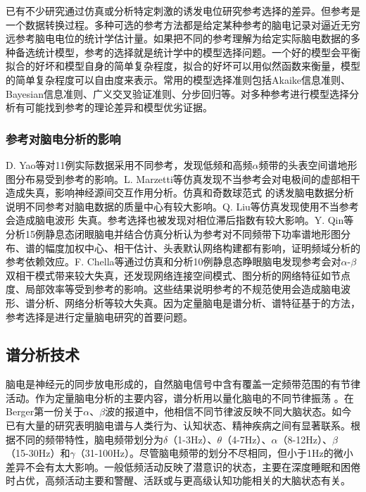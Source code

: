 已有不少研究通过仿真或分析特定刺激的诱发电位研究参考选择的差异。但参考是一个数据转换过程。多种可选的参考方法都是给定某种参考的脑电记录对逼近无穷远参考脑电电位的统计学估计量。如果把不同的参考理解为给定实际脑电数据的多种备选统计模型，参考的选择就是统计学中的模型选择问题。一个好的模型会平衡拟合的好坏和模型自身的简单复杂程度，拟合的好坏可以用似然函数来衡量，模型的简单复杂程度可以自由度来表示。常用的模型选择准则包括Akaike信息准则、Bayesian信息准则、广义交叉验证准则、分步回归等。对多种参考进行模型选择分析有可能找到参考的理论差异和模型优劣证据。

\subsubsection{参考对脑电分析的影响}
D. Yao等对11例实际数据采用不同参考，发现低频和高频$\alpha$频带的头表空间谱地形图分布易受到参考的影响。L. Marzetti等仿真发现不当参考会对电极间的虚部相干造成失真，影响神经源间交互作用分析。仿真和奇数球范式
的诱发脑电数据分析说明不同参考对脑电数据的质量中心有较大影响。Q. Liu等仿真发现使用不当参考会造成脑电波形
失真。参考选择也被发现对相位滞后指数有较大影响。Y. Qin等分析15例静息态闭眼脑电并结合仿真分析认为参考对不同频带下功率谱地形图分布、谱的幅度加权中心、相干估计、头表默认网络构建都有影响，证明频域分析的参考依赖效应。F. Chella等通过仿真和分析10例静息态睁眼脑电发现参考会对$\alpha$-$\beta$双相干模式带来较大失真，还发现网络连接空间模式、图分析的网络特征如节点度、局部效率等受到参考的影响。这些结果说明参考的不规范使用会造成脑电波形、谱分析、网络分析等较大失真。因为定量脑电是谱分析、谱特征基于的方法，参考选择是进行定量脑电研究的首要问题。

\subsection{谱分析技术}
脑电是神经元的同步放电形成的，自然脑电信号中含有覆盖一定频带范围的有节律活动。作为定量脑电分析的主要内容，谱分析用以量化脑电的不同节律振荡
。在Berger第一份关于$\alpha$、$\beta$波的报道中，他相信不同节律波反映不同大脑状态。如今已有大量的研究表明脑电谱与人类行为、认知状态、精神疾病之间有显著联系。根据不同的频带特性，脑电频带划分为$\delta$（1-3Hz）、$\theta$（4-7Hz）、$\alpha$（8-12Hz）、$\beta$（15-30Hz）和$\gamma$（31-100Hz）。尽管脑电频带的划分不尽相同，但小于1Hz的微小差异不会有太大影响。一般低频活动反映了潜意识的状态，主要在深度睡眠和困倦时占优，高频活动主要和警醒、活跃或与更高级认知功能相关的大脑状态有关。

